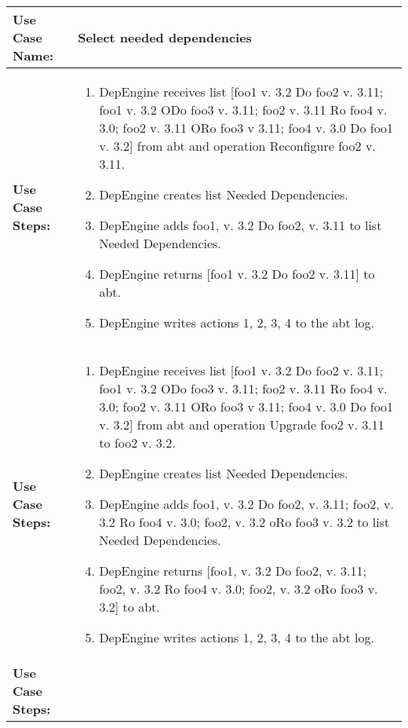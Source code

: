 \begin{tabularx}{\linewidth}{|l|X|}
\hline
\textbf{Use Case Name:} & \textbf{Select needed dependencies} \\
\hline
\textbf{Use Case Steps:} & 
\begin{minipage}{\linewidth} 
  \vspace{0.05em}
  \begin{enumerate}
  \item DepEngine receives list [foo1 v. 3.2 Do foo2 v. 3.11; foo1 v. 3.2 ODo foo3 v. 3.11; foo2 v. 3.11 Ro foo4 v. 3.0; foo2 v. 3.11 ORo foo3 v 3.11; foo4 v. 3.0 Do foo1 v. 3.2] from abt and operation Reconfigure foo2 v. 3.11.
  \item DepEngine creates list Needed Dependencies.
  \item DepEngine adds foo1, v. 3.2 Do foo2, v. 3.11 to list Needed Dependencies.
  \item DepEngine returns [foo1 v. 3.2 Do foo2 v. 3.11] to abt.
  \item DepEngine writes actions 1, 2, 3, 4 to the abt log.
    \end{enumerate}
  \vspace{0.05em}
\end{minipage}
\\
\hline 
\textbf{Use Case Steps:} & 
\begin{minipage}{\linewidth} 
  \vspace{0.05em}
  \begin{enumerate}
  \item DepEngine receives list [foo1 v. 3.2 Do foo2 v. 3.11; foo1 v. 3.2 ODo foo3 v. 3.11; foo2 v. 3.11 Ro foo4 v. 3.0; foo2 v. 3.11 ORo foo3 v 3.11; foo4 v. 3.0 Do foo1 v. 3.2] from abt and operation Upgrade foo2 v. 3.11 to foo2 v. 3.2.
  \item DepEngine creates list Needed Dependencies.
  \item DepEngine adds foo1, v. 3.2 Do foo2, v. 3.11; foo2, v. 3.2 Ro foo4 v. 3.0; foo2, v. 3.2 oRo foo3 v. 3.2 to list Needed Dependencies.
  \item DepEngine returns [foo1, v. 3.2 Do foo2, v. 3.11; foo2, v. 3.2 Ro foo4 v. 3.0; foo2, v. 3.2 oRo foo3 v. 3.2] to abt.
  \item DepEngine writes actions 1, 2, 3, 4 to the abt log.
    \end{enumerate}
  \vspace{0.05em}
\end{minipage}
\\
\hline 
\textbf{Use Case Steps:} & 

\end{tabularx}
